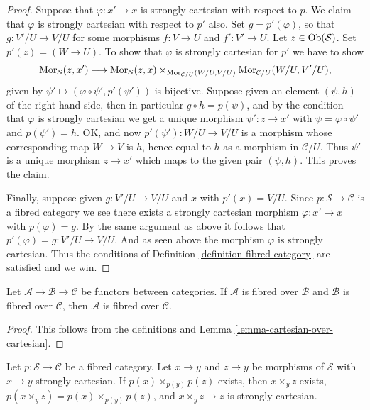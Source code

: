 \begin{proof}
Suppose that $\varphi : x' \to x$ is strongly cartesian with respect to $p$.
We claim that $\varphi$ is strongly cartesian with respect to $p'$ also.
Set $g = p'(\varphi)$, so that $g : V'/U \to V/U$
for some morphisms $f : V \to U$ and $f' : V' \to U$.
Let $z \in \mathop{\mathrm{Ob}}\nolimits(\mathcal{S})$. Set $p'(z) = (W \to U)$.
To show that $\varphi$ is strongly cartesian for $p'$ we have to show
$$
\mathop{\mathrm{Mor}}\nolimits_\mathcal{S}(z, x')
\longrightarrow
\mathop{\mathrm{Mor}}\nolimits_\mathcal{S}(z, x)
\times_{\mathop{\mathrm{Mor}}\nolimits_{\mathcal{C}/U}(W/U, V/U)}
\mathop{\mathrm{Mor}}\nolimits_{\mathcal{C}/U}(W/U, V'/U),
$$
given by $\psi' \longmapsto (\varphi \circ \psi', p'(\psi'))$
is bijective. Suppose given an element $(\psi, h)$ of the
right hand side, then in particular $g \circ h = p(\psi)$,
and by the condition that $\varphi$ is strongly cartesian we
get a unique morphism $\psi' : z \to x'$ with $\psi = \varphi \circ \psi'$
and $p(\psi') = h$. OK, and now $p'(\psi') : W/U \to V/U$
is a morphism whose corresponding map $W \to V$ is $h$, hence
equal to $h$ as a morphism in $\mathcal{C}/U$. Thus $\psi'$ is
a unique morphism $z \to x'$ which maps to the given pair $(\psi, h)$.
This proves the claim.

\medskip\noindent
Finally, suppose given $g : V'/U \to V/U$ and $x$ with $p'(x) = V/U$.
Since $p : \mathcal{S} \to \mathcal{C}$ is a fibred category we
see there exists a strongly cartesian morphism $\varphi : x' \to x$
with $p(\varphi) = g$. By the same argument as above it follows
that $p'(\varphi) = g : V'/U \to V/U$. And as seen above the morphism
$\varphi$ is strongly cartesian. Thus the conditions of
Definition \ref{definition-fibred-category} are satisfied and we win.
\end{proof}

\begin{lemma}
\label{lemma-fibred-over-fibred}
Let $\mathcal{A} \to \mathcal{B} \to \mathcal{C}$ be functors between
categories. If $\mathcal{A}$ is fibred over $\mathcal{B}$ and
$\mathcal{B}$ is fibred over $\mathcal{C}$, then $\mathcal{A}$
is fibred over $\mathcal{C}$.
\end{lemma}

\begin{proof}
This follows from the definitions and
Lemma \ref{lemma-cartesian-over-cartesian}.
\end{proof}

\begin{lemma}
\label{lemma-fibred-category-representable-goes-up}
Let $p : \mathcal{S} \to \mathcal{C}$ be a fibred category.
Let $x \to y$ and $z \to y$ be morphisms of $\mathcal{S}$
with $x \to y$ strongly cartesian. If $p(x) \times_{p(y)} p(z)$ exists,
then $x \times_y z$ exists, $p(x \times_y z) = p(x) \times_{p(y)} p(z)$,
and $x \times_y z \to z$ is strongly cartesian.
\end{lemma}

